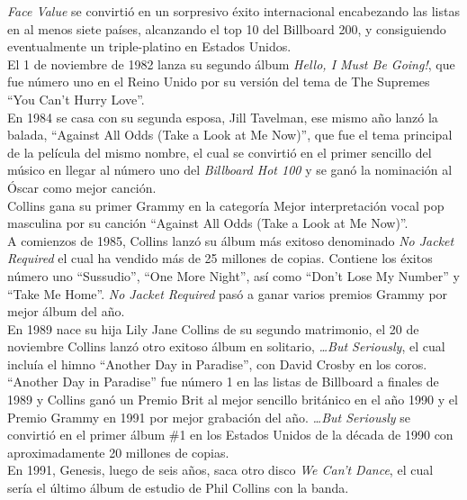 \documentclass[11pt, oneside]{book}
\begin{document}
  \emph{Face Value} se convirtió en un sorpresivo éxito internacional encabezando las listas en al menos siete países, alcanzando el top 10 del Billboard 200, y consiguiendo eventualmente un triple-platino en Estados Unidos.\\

  El 1 de noviembre de 1982 lanza su segundo álbum \emph{Hello, I Must Be Going!}, que fue número uno en el Reino Unido por su versión del tema de The Supremes ``You Can't Hurry Love''.\\

  En 1984 se casa con su segunda esposa, Jill Tavelman, ese mismo año lanzó la balada, ``Against All Odds (Take a Look at Me Now)'', que fue el tema principal de la película del mismo nombre, el cual se convirtió en el primer sencillo del músico en llegar al número uno del \emph{Billboard Hot 100} y se ganó la nominación al Óscar como mejor canción.\\

  Collins gana su primer Grammy en la categoría Mejor interpretación vocal pop masculina por su canción ``Against All Odds (Take a Look at Me Now)''.\\

  A comienzos de 1985, Collins lanzó su álbum más exitoso denominado \emph{No Jacket Required} el cual ha vendido más de 25 millones de copias. Contiene los éxitos número uno ``Sussudio'', ``One More Night'', así como ``Don't Lose My Number'' y ``Take Me Home''. \emph{No Jacket Required} pasó a ganar varios premios Grammy por mejor álbum del año.\\

  En 1989 nace su hija Lily Jane Collins de su segundo matrimonio, el 20 de noviembre Collins lanzó otro exitoso álbum en solitario, \emph{\dots But Seriously}, el cual incluía el himno ``Another Day in Paradise'', con David Crosby en los coros. ``Another Day in Paradise'' fue número 1 en las listas de Billboard a finales de 1989 y Collins ganó un Premio Brit al mejor sencillo británico en el año 1990 y el Premio Grammy en 1991 por mejor grabación del año. \emph{\dots But Seriously} se convirtió en el primer álbum \#1 en los Estados Unidos de la década de 1990 con aproximadamente 20 millones de copias.\\

  En 1991, Genesis, luego de seis años, saca otro disco \emph{We Can't Dance}, el cual sería el último álbum de estudio de Phil Collins con la banda.\\
\end{document}
